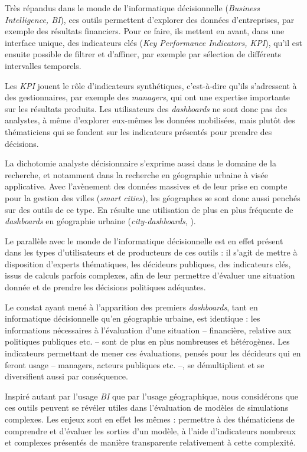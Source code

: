 	Très répandus dans le monde de l'informatique décisionnelle (\textit{Business Intelligence, BI}), ces outils permettent d'explorer des données d'entreprises, par exemple des résultats financiers.
	Pour ce faire, ils mettent en avant, dans une interface unique, des indicateurs clés (\textit{Key Performance Indicators, KPI}), qu'il est ensuite possible de filtrer et d'affiner, par exemple par sélection de différents intervalles temporels.

	Les \textit{KPI} jouent le rôle d'indicateurs synthétiques, c'est-à-dire qu'ils s'adressent à des gestionnaires, par exemple des \textit{managers}, qui ont une expertise importante sur les résultats produits.
	Les utilisateurs des \textit{dashboards} ne sont donc pas des analystes, à même d'explorer eux-mêmes les données mobilisées, mais plutôt des thématiciens qui se fondent sur les indicateurs présentés pour prendre des décisions.

	La dichotomie \og analyste décisionnaire\fg{} s'exprime aussi dans le domaine de la recherche, et notamment dans la recherche en géographie urbaine à visée applicative.
	Avec l'avènement des données massives et de leur prise en compte pour la gestion des villes (\textit{smart cities}), les géographes se sont donc aussi penchés sur des outils de ce type.
	En résulte une utilisation de plus en plus fréquente de \textit{dashboards} en géographie urbaine (\og \textit{city-dashboards}\fg{}, \cite{roumpani_creating_2013, kitchin_knowing_2015, batty_perspective_2015}).

	Le parallèle avec le monde de l'informatique décisionnelle est en effet présent dans les types d'utilisateurs et de producteurs de ces outils : il s'agit de mettre à disposition d'experts thématiques, les décideurs publiques, des indicateurs clés, issus de calculs parfois complexes, afin de leur permettre d'évaluer une situation donnée et de prendre les décisions politiques adéquates.

	Le constat ayant mené à l'apparition des premiers \textit{dashboards}, tant en informatique décisionnelle qu'en géographie urbaine, est identique : les informations nécessaires à l'évaluation d'une situation -- financière, relative aux politiques publiques etc. -- sont de plus en plus nombreuses et hétérogènes.
	Les indicateurs permettant de mener ces évaluations, pensés pour les décideurs qui en feront usage -- managers, acteurs publiques etc. --, se démultiplient et se diversifient aussi par conséquence.

	Inspiré autant par l'usage \textit{BI} que par l'usage géographique, nous considérons que ces outils peuvent se révéler utiles dans l'évaluation de modèles de simulations complexes.
	Les enjeux sont en effet les mêmes : permettre à des thématiciens de comprendre et d'évaluer les sorties d'un modèle, à l'aide d'indicateurs nombreux et complexes présentés de manière transparente relativement à cette complexité.

